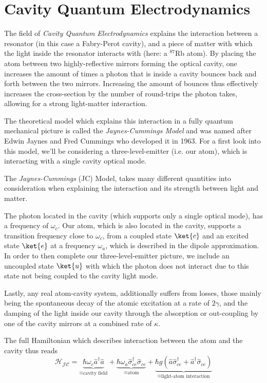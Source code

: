 \section{Cavity Quantum Electrodynamics}

The field of \textit{Cavity Quantum Electrodynamics} explains the interaction between a resonator (in this case a Fabry-Perot cavity), and a piece of matter with which the light inside the resonator interacts with (here: a $^{87}\text{Rb}$ atom). By placing the atom between two highly-reflective mirrors forming the optical cavity, one increases the amount of times a photon that is inside a cavity bounces back and forth between the two mirrors. Increasing the amount of bounces thus effectively increases the cross-section by the number of round-trips the photon takes, allowing for a strong light-matter interaction.\cite{RempeReiserer2015}

The theoretical model which explains this interaction in a fully quantum mechanical picture is called the \textit{Jaynes-Cummings Model} \cite{JaynesCummings1963} and was named after Edwin Jaynes and Fred Cummings who developed it in 1963. For a first look into this model, we'll be considering a three-level-emitter (i.e. our atom), which is interacting with a single cavity optical mode.

The \textit{Jaynes-Cummings} (JC) Model, takes many different quantities into consideration when explaining the interaction and its strength between light and matter.

The photon located in the cavity (which supports only a single optical mode), has a frequency of $\omega_c$.
Our atom, which is also located in the cavity, supports a transition frequency close to $\omega_c$, from a coupled state $\ket{c}$ and an excited state $\ket{e}$ at a frequency $\omega_a$, which is described in the dipole approximation.
In order to then complete our three-level-emitter picture, we include an uncoupled state $\ket{u}$ with which the photon does not interact due to this state not being coupled to the cavity light mode.

Lastly, any real atom-cavity system, additionally suffers from losses, those mainly being the spontaneous decay of the atomic excitation at a rate of $2\gamma$, and the damping of the light inside our cavity through the absorption or out-coupling by one of the cavity mirrors at a combined rate of $\kappa$.

The full Hamiltonian which describes interaction between the atom and the cavity thus reads \cite{JC1963}
\begin{equation}
	\mathcal{H_{JC}} = \underbrace{\hbar\omega_{c} \hat{a}^\dag\hat{a}}_{\widehat{=}\text{cavity field}} + \underbrace{\hbar\omega_a \hat{\sigma}_{ce}^\dag\hat{\sigma}_{ce}}_{\widehat{=}\text{atom}} + \underbrace{\hbar g(\hat{a}\hat{\sigma}_{ce}^\dag + \hat{a}^\dag\hat{\sigma}_{ce})}_{\widehat{=}\text{light-atom interaction}}
	\label{eq:jc_hamiltonian_simple}
\end{equation}

